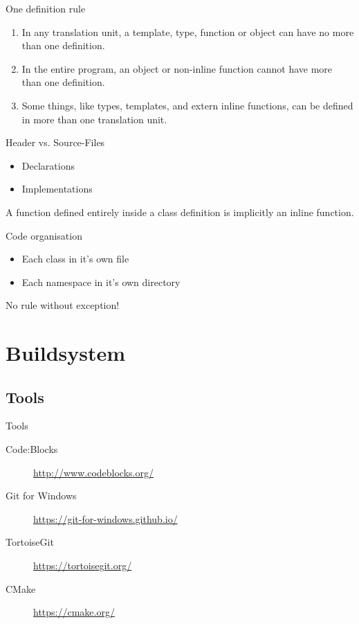 \documentclass{beamer}
\begin{document}
\begin{frame}{One definition rule}
\begin{enumerate}
  \item In any translation unit, a template, type, function or object can have
  no more than one definition.
  \item In the entire program, an object or non-inline function cannot have more
  than one definition.
  \item Some things, like types, templates, and extern inline functions, can be
  defined in more than one translation unit.
\end{enumerate}
\end{frame}

\begin{frame}{Header vs. Source-Files}
\begin{itemize}
  \item [Header] Declarations
  \item [Source] Implementations 
\end{itemize}
A function defined entirely inside a class definition is implicitly an inline
function.
\end{frame}

\begin{frame}{Code organisation}
\begin{itemize}
  \item Each class in it's own file
  \item Each namespace in it's own directory
\end{itemize}
No rule without exception!
\end{frame}


\section{Buildsystem}
\subsection{Tools}
\begin{frame}{Tools}
\begin{description}
  \item[Code:Blocks] \url{http://www.codeblocks.org/}
  \item[Git for Windows] \url{https://git-for-windows.github.io/}
  \item[TortoiseGit] \url{https://tortoisegit.org/}
  \item[CMake] \url{https://cmake.org/}  
\end{description}
\end{frame}
\end{document}

